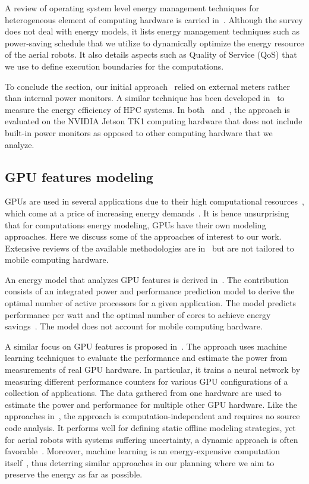 A review of operating system level energy management techniques for heterogeneous element of computing hardware is carried in~\citep{kim2018survey}. Although the survey does not deal with energy models, it lists energy management techniques such as power-saving schedule that we utilize to dynamically optimize the energy resource of the aerial robots. It also details aspects such as Quality of Service (QoS) that we use to define execution boundaries for the computations. 

To conclude the section, our initial approach~\citep{seewald2019hlpgpu} relied on external meters rather than internal power monitors. A similar technique has been developed in~\citep{calore2015energy} to measure the energy efficiency of HPC systems. In both \citep{seewald2019hlpgpu}~and~\citep{calore2015energy}, the approach is evaluated on the NVIDIA Jetson TK1 computing hardware that does not include built-in power monitors as opposed to other computing hardware that we analyze.


\subsection{GPU features modeling}

GPUs are used in several applications due to their high computational resources~\citep{kasichayanula2012power}, which come at a price of increasing energy demands~\citep{mittal2014survey}. It is hence unsurprising that for computations energy modeling, GPUs have their own modeling approaches. Here we discuss some of the approaches of interest to our work. Extensive reviews of the available methodologies are in~\citep{mittal2014survey,bridges2016understanding} but are not tailored to mobile computing hardware.

An energy model that analyzes GPU features is derived in~\citep{hong2010integrated}. The contribution consists of an integrated power and performance prediction model to derive the optimal number of active processors for a given application. The model predicts performance per watt and the optimal number of cores to achieve energy savings~\citep{hong2010integrated}. The model does not account for mobile computing hardware.

A similar focus on GPU features is proposed in~\citep{wu2015gpgpu}. The approach uses machine learning techniques to evaluate the performance and estimate the power from measurements of real GPU hardware. In particular, it trains a neural network by measuring different performance counters for various GPU configurations of a collection of applications. The data gathered from one hardware are used to estimate the power and performance for multiple other GPU hardware. Like the approaches in~, the approach is computation-independent and requires no source code analysis. It performs well for defining static offline modeling strategies, yet for aerial robots with systems suffering uncertainty, a dynamic approach is often favorable~\citep{seewald2019coarse}. Moreover, machine learning is an energy-expensive computation itself~\citep{garcia2019estimation,yang2017method}, thus deterring similar approaches in our planning where we aim to preserve the energy as far as possible.

